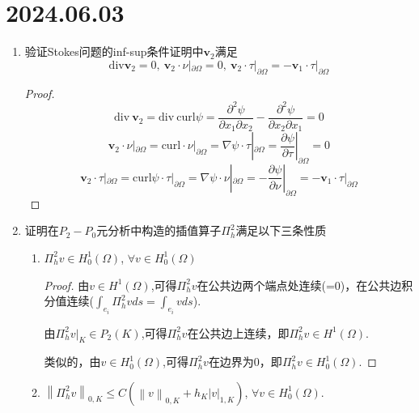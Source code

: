\documentclass[12pt,a4paper]{article}
\begin{document}
	
	\noindent
	
	\section*{2024.06.03}	
	
	\begin{enumerate}
		
		\item 验证Stokes问题的inf-sup条件证明中$\mathbf{v}_2$满足
		$$\mathrm{div} \mathbf{v}_2=0,\:\mathbf{v}_2\cdot\nu|_{\partial\Omega}=0,\:\mathbf{v}_2\cdot\tau|_{\partial\Omega}=-\mathbf{v}_1\cdot\tau|_{\partial\Omega}$$
		
		\begin{proof}
			$$\mathrm{div} \  \mathbf{v}_2 = \mathrm{div} \ \mathrm{curl} \psi = \frac{\partial^2 \psi}{\partial x_1 \partial x_2} - \frac{\partial^2 \psi}{\partial x_2 \partial x_1} = 0  $$
			$$\mathbf{v}_2\cdot\nu|_{\partial\Omega}=\mathrm{curl} \cdot \nu|_{\partial \Omega}=\nabla \psi \cdot \tau |_{\partial \Omega}=\frac{\partial \psi}{\partial \tau} |_{\partial\Omega}=0$$
			$$\mathbf{v}_2\cdot\tau|_{\partial\Omega}=\mathrm{curl} \psi \cdot \tau|_{\partial\Omega}=\nabla \psi \cdot \nu |_{\partial\Omega}=- \frac{\partial \psi}{\partial \nu}|_{\partial \Omega}=-\mathbf{v}_1\cdot\tau|_{\partial\Omega}$$
		\end{proof}
		
		\item 证明在$P_2-P_0$元分析中构造的插值算子$\Pi_h^{2}$满足以下三条性质
		
		\begin{enumerate}
			\item $\Pi _{h}^{2}v\in H_{0}^{1}( \Omega )$, $\forall v\in H_{0}^{1}( \Omega )$
			
			\begin{proof}
				由$v \in H^1(\Omega)$,可得$\Pi_h^2 v$在公共边两个端点处连续(=0)，在公共边积分值连续($\int_{e_i} \Pi_h^2 v ds= \int_{e_i} v ds$).
				
				由$\Pi_h^2 v|_K \in P_2(K)$,可得$\Pi_h^2 v$在公共边上连续，即$\Pi_h^2 v \in H^1(\Omega)$.
				
				类似的，由$v \in H_0^1(\Omega)$,可得$\Pi_h^2 v$在边界为0，即$\Pi_h^2 v \in H_0^1(\Omega)$.
			\end{proof}
			
			\item $ \left \| \Pi _h^2v\right \| _{0, K}\leq C\left ( \left \| v\right \| _{0, K}+ h_K\left | v\right | _{1, K}\right )$, $\forall v\in H_0^1( \Omega )$.
			

\end{enumerate}
\end{enumerate}
\end{document}
